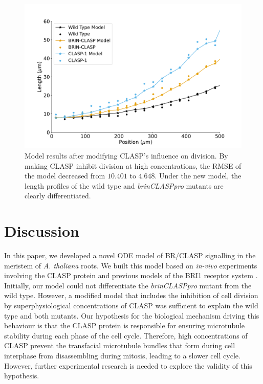 \documentclass[referee,pdflatex,sn-mathphys-num]{sn-jnl}
\begin{document}
\begin{figure}
  \centering
  \includegraphics[width=\textwidth]{column-modified-fit.pdf}
  \caption{Model results after modifying CLASP's influence on division. By making CLASP inhibit division at high concentrations, the RMSE of the model decreased from $10.401$ to $4.648$. Under the new model, the length profiles of the wild type and \emph{brinCLASPpro} mutants are clearly differentiated. }
  \label{column-modified-fit}
\end{figure}

 
\section{Discussion}\label{sec12}

In this paper, we developed a novel ODE model of BR/CLASP signalling in the meristem of \emph{A. thaliana} roots. We built this model based on \emph{in-vivo} experiments involving the CLASP protein \cite{ambrose2011, ruan2018, halat2022} and previous models of the BRI1 receptor system \cite{vanesse2012}. Initially, our model could not differentiate the \emph{brinCLASPpro} mutant from the wild type. However, a modified model that includes the inhibition of cell division by superphysiological concentrations of CLASP was sufficient to explain the wild type and both mutants. Our hypothesis for the biological mechanism driving this behaviour is that the CLASP protein is responsible for ensuring microtubule stability during each phase of the cell cycle. Therefore, high concentrations of CLASP prevent the transfacial microtubule bundles that form during cell interphase from disassembling during mitosis, leading to a slower cell cycle. However, further experimental research is needed to explore the validity of this hypothesis.
\end{document}
